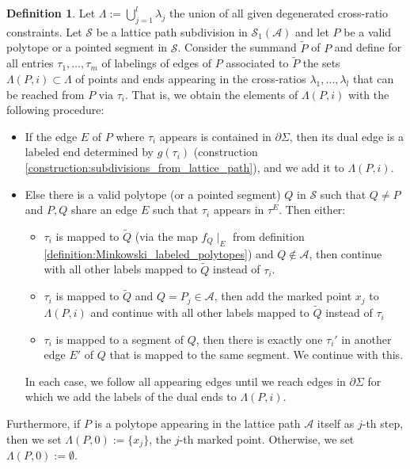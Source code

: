 \documentclass[11pt,reqno,a4]{amsart}
\theoremstyle{dotless}
\theoremstyle{definition}
\newtheorem{definition}[corollary]{Definition}
\begin{document}
\begin{definition}\label{definition:CR_fit}
Let $\Lambda:=\bigcup_{j=1}^l \lambda_j$ the union of all given degenerated cross-ratio constraints. Let $\mathcal{S}$ be a lattice path subdivision in $\mathcal{S}_1(\mathcal{A})$ and let $P$ be a valid polytope or a pointed segment in $\mathcal{S}$. Consider the summand $\tilde{P}$ of $P$ and define for all entries $\tau_1,\dots,\tau_m$ of labelings of edges of $P$ associated to $\tilde{P}$  the sets $\Lambda(P,i)\subset\Lambda$ of points and ends appearing in the cross-ratios $\lambda_1,\dots,\lambda_l$ that can be reached from $P$ via $\tau_i$. That is, we obtain the elements of $\Lambda(P,i)$ with the following procedure:
\begin{itemize}
\item
If the edge $E$ of $P$ where $\tau_i$ appears is contained in $\partial\Sigma$, then its dual edge is a labeled end determined by $g(\tau_i)$ (construction \ref{construction:subdivisions_from_lattice_path}), and we add it to $\Lambda(P,i)$.
\item
Else there is a valid polytope (or a pointed segment) $Q$ in $\mathcal{S}$ such that $Q\neq P$ and $P,Q$ share an edge $E$ such that $\tau_i$ appears in $\tau^E$. Then either:
\begin{itemize}
\item
$\tau_i$ is mapped to $\tilde{Q}$ (via the map $f_Q\mid_E$ from definition \ref{definition:Minkowski_labeled_polytopes}) and $Q\nin\mathcal{A}$, then continue with all other labels mapped to $\tilde{Q}$ instead of $\tau_i$. 
\item
$\tau_i$ is mapped to $\tilde{Q}$ and $Q=P_j\in\mathcal{A}$, then  add the marked point $x_j$ to $\Lambda(P,i)$ and continue with all other labels mapped to $\tilde{Q}$ instead of $\tau_i$
\item
$\tau_i$ is mapped to a segment of $Q$, then there is exactly one $\tau_i'$ in another edge $E'$ of $Q$ that is mapped to the same segment. We continue with this.
\end{itemize}
In each case, we follow all appearing edges until we reach edges in $\partial\Sigma$ for which we add the labels of the dual ends to $\Lambda(P,i)$.
\end{itemize}

Furthermore, if $P$ is a polytope appearing in the lattice path $\mathcal{A}$ itself as $j$-th step, then we set $\Lambda(P,0):=\lbrace
 x_j \rbrace$, the $j$-th marked point. Otherwise, we set $\Lambda(P,0):=\emptyset$.


\end{definition}
\end{document}
